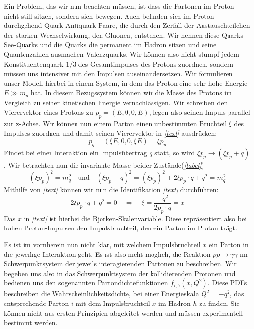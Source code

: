 Ein Problem, das wir nun beachten müssen, ist dass die Partonen im Proton nicht still sitzen, sondern sich bewegen. Auch befinden sich im Proton durchgehend Quark-Antiquark-Paare, die durch den Zerfall der Austauschteilchen der starken Wechselwirkung, den Gluonen, entstehen. Wir nennen diese Quarks See-Quarks und die Quarks die permanent im Hadron sitzen und seine Quantenzahlen ausmachen Valenzquarks. Wir können also nicht stumpf jedem Konstituentenquark $1/3$ des Gesamtimpulses des Protons zuordnen, sondern müssen uns intensiver mit den Impulsen auseinandersetzen. Wir formulieren unser Modell hierbei in einem System, in dem das Proton eine sehr hohe Energie $E \gg m_p$ hat. In diesem Bezugssystem können wir die Masse des Protons im Vergleich zu seiner kinetischen Energie vernachlässigen. Wir schreiben den Vierervektor eines Protons zu $p_p = (E, 0, 0, E)$, legen also seinen Impuls parallel zur z-Achse. Wir können nun einem Parton einen unbestimmten Bruchteil $\xi$ des Impulses zuordnen und damit seinen Vierervektor in  \textit{\autoref{text}} ausdrücken:
\begin{equation}
	p_q = (\xi E, 0, 0, \xi E) = \xi p_p
\end{equation}
Findet bei einer Interaktion ein Impulsübertrag $q$ statt, so wird $\xi p_p \rightarrow (\xi p_p + q)$. Wir betrachten nun die invariante Masse beider Zustände(\textit{\autoref{label}})
\begin{equation}
	\left(\xi p_p\right)^2 = m_q^2 \quad \text{und} \quad \left(\xi p_p + q\right)^2 = \left(\xi p_p\right)^2 + 2\xi p_p \cdot q + q^2 = m_q^2
\end{equation}
Mithilfe von \textit{\autoref{text}} können wir nun die Identifikation \textit{\autoref{text}} durchführen:
\begin{equation}
	2\xi p_p \cdot q + q^2 = 0 \quad \Rightarrow \quad \xi = \frac{-q^2}{2p_p\cdot q} = x
\end{equation}
Das $x$ in \textit{\autoref{text}} ist hierbei die Bjorken-Skalenvariable. Diese repräsentiert also bei hohen Proton-Impulsen den Impulsbruchteil, den ein Parton im Proton trägt. 

Es ist im vornherein nun nicht klar, mit welchem Impulsbruchteil $x$ ein Parton in die jeweilige Interaktion geht. Es ist also nicht möglich, die Reaktion $pp \rightarrow \gamma \gamma$ im Schwerpunktsystem der jeweils interagierenden Partonen zu beschreiben. Wir begeben uns also in das Schwerpunktsystem der kollidierenden Protonen und bedienen uns den sogenannten Partondichtefunktionen $f_{i,h}\left(x, Q^2\right)$. Diese PDFs beschreiben die Wahrscheinlichkeitsdichte, bei einer Energieskala $Q^2 = -q^2$, das entsprechende Parton $i$ mit dem Impulsbruchteil $x$ im Hadron $h$ zu finden. Sie können nicht aus ersten Prinzipien abgeleitet werden und müssen experimentell bestimmt werden. 

